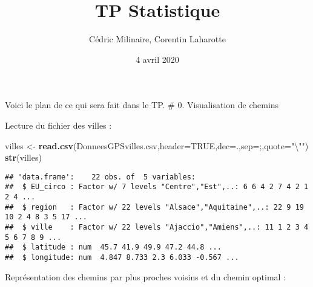 \documentclass[
]{article}
\title{TP Statistique}
\author{Cédric Milinaire, Corentin Laharotte}
\date{4 avril 2020}
\newenvironment{Shaded}{\begin{snugshade}}{\end{snugshade}}
\newcommand{\CharTok}[1]{\textcolor[rgb]{0.31,0.60,0.02}{#1}}
\newcommand{\DataTypeTok}[1]{\textcolor[rgb]{0.13,0.29,0.53}{#1}}
\newcommand{\KeywordTok}[1]{\textcolor[rgb]{0.13,0.29,0.53}{\textbf{#1}}}
\newcommand{\NormalTok}[1]{#1}
\newcommand{\OtherTok}[1]{\textcolor[rgb]{0.56,0.35,0.01}{#1}}
\newcommand{\StringTok}[1]{\textcolor[rgb]{0.31,0.60,0.02}{#1}}
\begin{document}
\maketitle

Voici le plan de ce qui sera fait dans le TP. \toc \# 0. Visualisation
de chemins

Lecture du fichier des villes :

\begin{Shaded}
\begin{Highlighting}[]
\NormalTok{villes \textless{}{-}}\StringTok{ }\KeywordTok{read.csv}\NormalTok{(}\StringTok{\textquotesingle{}DonneesGPSvilles.csv\textquotesingle{}}\NormalTok{,}\DataTypeTok{header=}\OtherTok{TRUE}\NormalTok{,}\DataTypeTok{dec=}\StringTok{\textquotesingle{}.\textquotesingle{}}\NormalTok{,}\DataTypeTok{sep=}\StringTok{\textquotesingle{};\textquotesingle{}}\NormalTok{,}\DataTypeTok{quote=}\StringTok{"}\CharTok{\textbackslash{}"}\StringTok{"}\NormalTok{)}
\KeywordTok{str}\NormalTok{(villes)}
\end{Highlighting}
\end{Shaded}

\begin{verbatim}
## 'data.frame':    22 obs. of  5 variables:
##  $ EU_circo : Factor w/ 7 levels "Centre","Est",..: 6 6 4 2 7 4 2 1 2 4 ...
##  $ region   : Factor w/ 22 levels "Alsace","Aquitaine",..: 22 9 19 10 2 4 8 3 5 17 ...
##  $ ville    : Factor w/ 22 levels "Ajaccio","Amiens",..: 11 1 2 3 4 5 6 7 8 9 ...
##  $ latitude : num  45.7 41.9 49.9 47.2 44.8 ...
##  $ longitude: num  4.847 8.733 2.3 6.033 -0.567 ...
\end{verbatim}

Représentation des chemins par plus proches voisins et du chemin optimal
:
\end{document}
